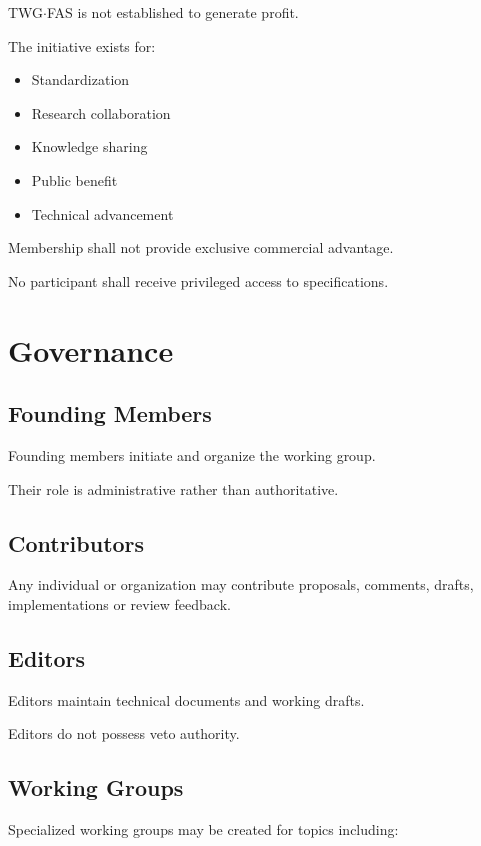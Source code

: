 \documentclass[11pt,a4paper]{article}
\begin{document}
TWG$\cdot$FAS is not established to generate profit.

The initiative exists for:

\begin{itemize}
\item Standardization
\item Research collaboration
\item Knowledge sharing
\item Public benefit
\item Technical advancement
\end{itemize}

Membership shall not provide exclusive commercial advantage.

No participant shall receive privileged access to specifications.

\section{Governance}

\subsection{Founding Members}

Founding members initiate and organize the working group.

Their role is administrative rather than authoritative.

\subsection{Contributors}

Any individual or organization may contribute proposals, comments,
drafts, implementations or review feedback.

\subsection{Editors}

Editors maintain technical documents and working drafts.

Editors do not possess veto authority.

\subsection{Working Groups}

Specialized working groups may be created for topics including:
\end{document}
